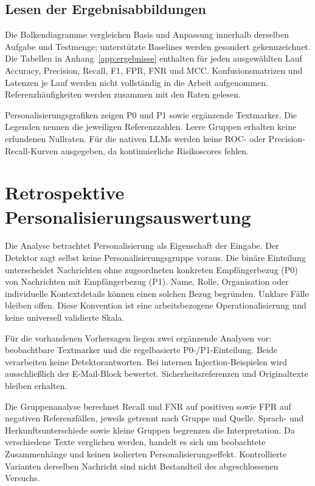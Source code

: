 \documentclass[12pt,twoside=false,a4paper,parskip]{scrbook}
\begin{document}
\subsection{Lesen der Ergebnisabbildungen}\label{sec:dashboard-formeln}

Die Balkendiagramme vergleichen Basis und Anpassung innerhalb derselben Aufgabe und Testmenge; unterstützte Baselines werden gesondert gekennzeichnet. Die Tabellen in Anhang~\ref{app:ergebnisse} enthalten für jeden ausgewählten Lauf Accuracy, Precision, Recall, F1, FPR, FNR und MCC. Konfusionsmatrizen und Latenzen je Lauf werden nicht vollständig in die Arbeit aufgenommen. Referenzhäufigkeiten werden zusammen mit den Raten gelesen.

Personalisierungsgrafiken zeigen P0 und P1 sowie ergänzende Textmarker. Die Legenden nennen die jeweiligen Referenzzahlen. Leere Gruppen erhalten keine erfundenen Nullraten. Für die nativen LLMs werden keine ROC- oder Precision-Recall-Kurven ausgegeben, da kontinuierliche Risikoscores fehlen.

\section{Retrospektive Personalisierungsauswertung}\label{sec:personalisierung-experimente}

Die Analyse betrachtet Personalisierung als Eigenschaft der Eingabe. Der Detektor sagt selbst keine Personalisierungsgruppe voraus. Die binäre Einteilung unterscheidet Nachrichten ohne zugeordneten konkreten Empfängerbezug (P0) von Nachrichten mit Empfängerbezug (P1). Name, Rolle, Organisation oder individuelle Kontextdetails können einen solchen Bezug begründen. Unklare Fälle bleiben offen. Diese Konvention ist eine arbeitsbezogene Operationalisierung und keine universell validierte Skala.

Für die vorhandenen Vorhersagen liegen zwei ergänzende Analysen vor: beobachtbare Textmarker und die regelbasierte P0-/P1-Einteilung. Beide verarbeiten keine Detektorantworten. Bei internen Injection-Beispielen wird ausschließlich der E-Mail-Block bewertet. Sicherheitsreferenzen und Originaltexte bleiben erhalten.

Die Gruppenanalyse berechnet Recall und FNR auf positiven sowie FPR auf negativen Referenzfällen, jeweils getrennt nach Gruppe und Quelle. Sprach- und Herkunftsunterschiede sowie kleine Gruppen begrenzen die Interpretation. Da verschiedene Texte verglichen werden, handelt es sich um beobachtete Zusammenhänge und keinen isolierten Personalisierungseffekt. Kontrollierte Varianten derselben Nachricht sind nicht Bestandteil des abgeschlossenen Versuchs.
\end{document}
